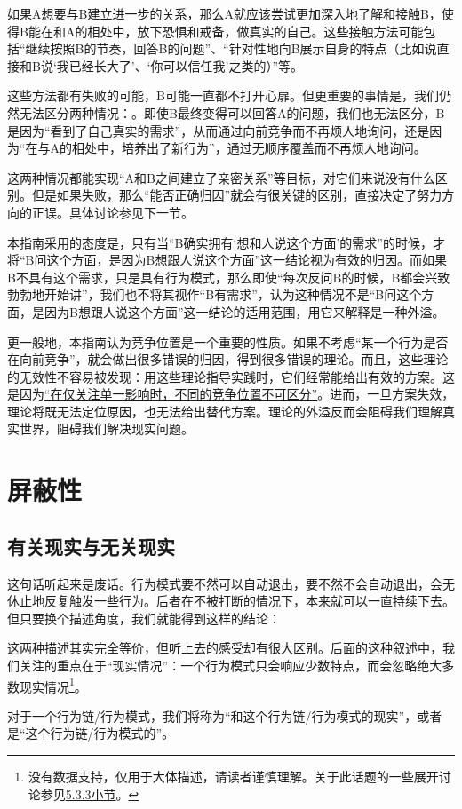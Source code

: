 \begin{explain}
如果A想要与B建立进一步的关系，那么A就应该尝试更加深入地了解和接触B，使得B能在和A的相处中，放下恐惧和戒备，做真实的自己。这些接触方法可能包括“继续按照B的节奏，回答B的问题”、“针对性地向B展示自身的特点（比如说直接和B说‘我已经长大了’、‘你可以信任我’之类的）”等。

这些方法都有失败的可能，B可能一直都不打开心扉。但更重要的事情是，我们仍然无法区分两种情况：。即使B最终变得可以回答A的问题，我们也无法区分，B是因为“看到了自己真实的需求”，从而通过向前竞争而不再烦人地询问，还是因为“在与A的相处中，培养出了新行为”，通过无顺序覆盖而不再烦人地询问。

这两种情况都能实现“A和B之间建立了亲密关系”等目标，对它们来说没有什么区别。但是如果失败，那么“能否正确归因”就会有很关键的区别，直接决定了努力方向的正误。具体讨论参见下一节。
\end{explain}
本指南采用的态度是，只有当“B确实拥有‘想和人说这个方面’的需求”的时候，才将“B问这个方面，是因为B想跟人说这个方面”这一结论视为有效的归因。而如果B不具有这个需求，只是具有行为模式，那么即使“每次反问B的时候，B都会兴致勃勃地开始讲”，我们也不将其视作“B有需求”，认为这种情况不是“B问这个方面，是因为B想跟人说这个方面”这一结论的适用范围，用它来解释是一种外溢。

更一般地，本指南认为竞争位置是一个重要的性质。如果不考虑“某一个行为是否在向前竞争”，就会做出很多错误的归因，得到很多错误的理论。而且，这些理论的无效性不容易被发现：用这些理论指导实践时，它们经常能给出有效的方案。这是因为\hyperref[para:覆盖位置]{“在仅关注单一影响时，不同的竞争位置不可区分”}。进而，一旦方案失效，理论将既无法定位原因，也无法给出替代方案。理论的外溢反而会阻碍我们理解真实世界，阻碍我们解决现实问题。

\section{屏蔽性}
\subsection{有关现实与无关现实}
\noindent{}
\begin{explain}
这句话听起来是废话。行为模式要不然可以自动退出，要不然不会自动退出，会无休止地反复触发一些行为。后者在不被打断的情况下，本来就可以一直持续下去。但只要换个描述角度，我们就能得到这样的结论：

这两种描述其实完全等价，但听上去的感受却有很大区别。后面的这种叙述中，我们关注的重点在于“现实情况”：一个行为模式只会响应少数特点，而会忽略绝大多数现实情况\footnote{没有数据支持，仅用于大体描述，请读者谨慎理解。关于此话题的一些展开讨论参见\hyperref[sec:行为的屏蔽性]{5.3.3小节}。}。
\end{explain}
对于一个行为链/行为模式，我们将称为“和这个行为链/行为模式的现实”，或者是“这个行为链/行为模式的”。

